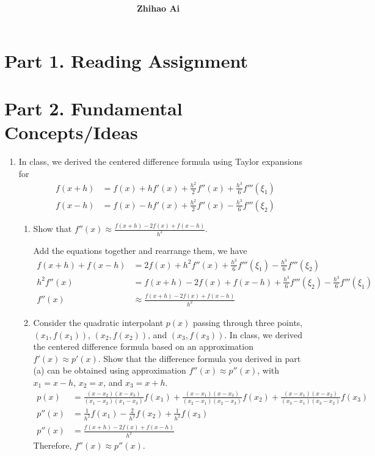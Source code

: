 \documentclass[10pt]{report}
\title{
	\vspace{2in}
	\textmd{\textbf{\hwCourse\\\hwTitle}}\\
	\vspace{0.3in}\large{\textit{\hmwkClassInstructor}}
	\vspace{3in}
}
\author{\textbf{Zhihao Ai}}
\date{}
\newcommand{\ds}{\displaystyle}
\begin{document}
\maketitle

\section*{Part 1. Reading Assignment}

\section*{Part 2. Fundamental Concepts/Ideas}
\begin{enumerate}
	\item 
	In class, we derived the centered difference formula using Taylor expansions for
	\begin{align*}
		f(x+h) &= f(x) + hf'(x) + \frac{h^2}{2}f''(x) + \frac{h^3}{6}f'''(\xi_1)\\
		f(x-h) &= f(x) - hf'(x) + \frac{h^2}{2}f''(x) - \frac{h^3}{6}f'''(\xi_2)
	\end{align*}
	\begin{enumerate}
		\item 
		Show that $\ds f''(x) \approx \frac{f(x+h) - 2f(x) + f(x-h)}{h^2}$.
		
		Add the equations together and rearrange them, we have
		\begin{align*}
			f(x+h) + f(x-h) &= 2f(x) + h^2 f''(x) + \frac{h^3}{6}f'''(\xi_1) - \frac{h^3}{6}f'''(\xi_2)\\
			h^2 f''(x) &= f(x+h) - 2f(x) + f(x-h) +\frac{h^3}{6}f'''(\xi_2) - \frac{h^3}{6}f'''(\xi_1)\\
			f''(x) &\approx \frac{f(x+h) - 2f(x) + f(x-h)}{h^2}
		\end{align*}
		
		\item
		Consider the quadratic interpolant $p(x)$ passing through three points, $(x_1, f(x_1))$, $(x_2, f(x_2))$, and $(x_3, f(x_3))$. In class, we derived the centered
		difference formula based on an approximation $f'(x) \approx p'(x)$. Show that the difference formula you derived in part (a) can be obtained using approximation $f''(x) \approx p''(x)$, with $x_1 = x - h$, $x_2 = x$, and $x_3 = x + h$.
		\begin{align*}
			p(x) &= \frac{(x-x_2)(x-x_3)}{(x_1 - x_2)(x_1 - x_3)}f(x_1) 
			+ \frac{(x-x_1)(x-x_3)}{(x_2 - x_1)(x_2 - x_3)}f(x_2)
			+ \frac{(x-x_1)(x-x_2)}{(x_3 - x_1)(x_3 - x_2)}f(x_3)\\
			p''(x) &= \frac{1}{h^2} f(x_1) - \frac{2}{h^2} f(x_2) + \frac{1}{h^2} f(x_3)\\
			p''(x) &= \frac{f(x+h) - 2f(x) + f(x-h)}{h^2}
 		\end{align*}
		Therefore, $f''(x) \approx p''(x)$.
		

\end{enumerate}
\end{enumerate}
\end{document}
